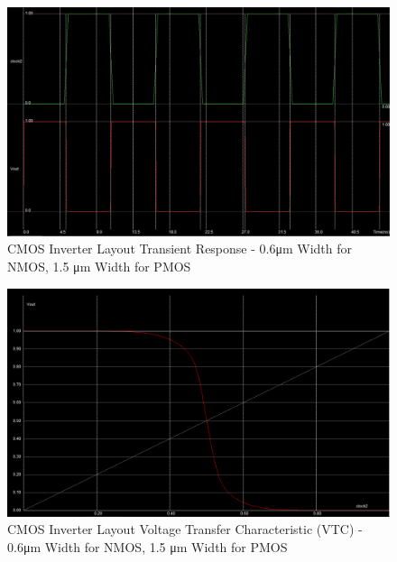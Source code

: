 \begin{figure}[h!]
	\centering
	\includegraphics[scale=0.50]{./images/inverter_transient_06nmos_15pmos.PNG}
	\caption{CMOS Inverter Layout Transient Response - 0.6\si{\micro\meter} Width for NMOS, 1.5 \si{\micro\meter} Width for PMOS}
	\label{fig:inverter_transient_06nmos_15pmos}
\end{figure}

\FloatBarrier

\FloatBarrier

\begin{figure}[h!]
	\centering
	\includegraphics[scale=0.50]{./images/inverter_vtc_06nmos_15pmos.PNG}
	\caption{CMOS Inverter Layout Voltage Transfer Characteristic (VTC) - 0.6\si{\micro\meter} Width for NMOS, 1.5 \si{\micro\meter} Width for PMOS}
	\label{fig:inverter_vtc_06nmos_15pmos}
\end{figure}

\FloatBarrier

\FloatBarrier

